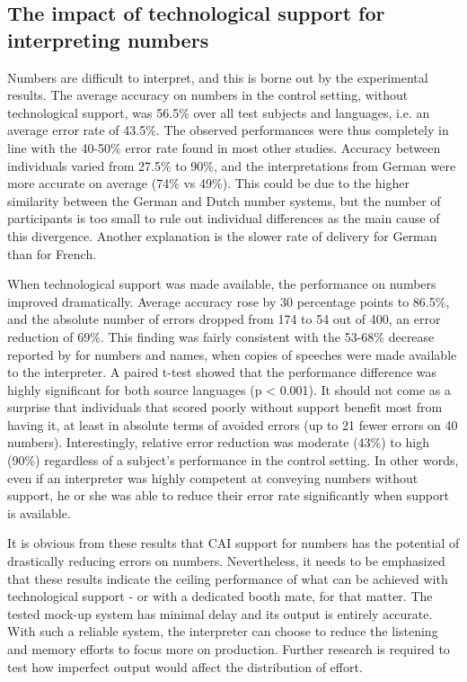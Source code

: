 \documentclass[output=paper]{langsci/langscibook}
\begin{document}
\subsection{The impact of technological support for interpreting numbers}
Numbers are difficult to interpret, and this is borne out by the experimental results. The average accuracy on numbers in the control setting, without technological support, was 56.5\% over all test subjects and languages, i.e. an average error rate of 43.5\%. The observed performances were thus completely in line with the 40-50\% error rate found in most other studies. Accuracy between individuals varied from 27.5\% to 90\%, and the interpretations from German were more accurate on average (74\% vs 49\%). This could be due to the higher similarity between the German and Dutch number systems, but the number of participants is too small to rule out individual differences as the main cause of this divergence. Another explanation is the slower rate of delivery for German than for French.

When technological support was made available, the performance on numbers improved dramatically. Average accuracy rose by 30 percentage points to 86.5\%, and the absolute number of errors dropped from 174 to 54 out of 400, an error reduction of 69\%. This finding was fairly consistent with the 53-68\% decrease reported by \citet{Lamberger-Felber2001} for numbers and names, when copies of speeches were made available to the interpreter. A paired t-test showed that the performance difference was highly significant for both source languages (p < 0.001). It should not come as a surprise that individuals that scored poorly without support benefit most from having it, at least in absolute terms of avoided errors (up to 21 fewer errors on 40 numbers). Interestingly, relative error reduction was moderate (43\%) to high (90\%) regardless of a subject’s performance in the control setting. In other words, even if an interpreter was highly competent at conveying numbers without support, he or she was able to reduce their error rate significantly when support is available.

It is obvious from these results that \textsc{CAI} support for numbers has the potential of drastically reducing errors on numbers. Nevertheless, it needs to be emphasized that these results indicate the ceiling performance of what can be achieved with technological support - or with a dedicated booth mate, for that matter. The tested mock-up system has minimal delay and its output is entirely accurate. With such a reliable system, the interpreter can choose to reduce the listening and memory efforts to focus more on production. Further research is required to test how imperfect output would affect the distribution of effort.
\end{document}
